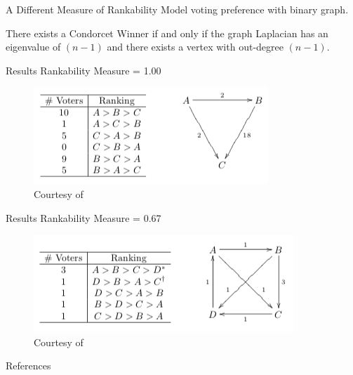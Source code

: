 \documentclass{beamer}
\begin{document}
\begin{frame}{A Different Measure of Rankability}
Model voting preference with binary graph.
\vfill
\begin{theorem}
There exists a Condorcet Winner if and only if the graph Laplacian has an eigenvalue of $(n-1)$ and there exists a vertex with out-degree $(n-1)$. 
\end{theorem}
\end{frame}

\begin{frame}{Results}
Rankability Measure = 1.00
\vfill
\begin{figure}[H]
\centering
\includegraphics[width=\textwidth]{figures/dodgson-fig1.png}
\caption{Courtesy of~\cite{Ratliff2010}}
\end{figure}
\end{frame}

\begin{frame}{Results}
Rankability Measure = 0.67
\vfill
\begin{figure}[H]
\centering
\includegraphics[width=\textwidth]{figures/dodgson-fig2.png}
\caption{Courtesy of~\cite{Ratliff2010}}
\end{figure}
\end{frame}

\begin{frame}[allowframebreaks]{References}


\end{frame}
\end{document}
